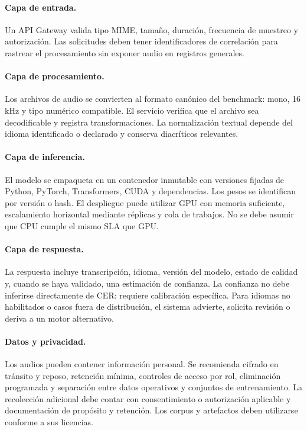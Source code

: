 \documentclass[11pt,letterpaper]{article}
\begin{document}
\paragraph{Capa de entrada.} Un API Gateway valida tipo MIME, tamaño, duración, frecuencia de muestreo y autorización. Las solicitudes deben tener identificadores de correlación para rastrear el procesamiento sin exponer audio en registros generales.

\paragraph{Capa de procesamiento.} Los archivos de audio se convierten al formato canónico del benchmark: mono, 16 kHz y tipo numérico compatible. El servicio verifica que el archivo sea decodificable y registra transformaciones. La normalización textual depende del idioma identificado o declarado y conserva diacríticos relevantes.

\paragraph{Capa de inferencia.} El modelo se empaqueta en un contenedor inmutable con versiones fijadas de Python, PyTorch, Transformers, CUDA y dependencias. Los pesos se identifican por versión o hash. El despliegue puede utilizar GPU con memoria suficiente, escalamiento horizontal mediante réplicas y cola de trabajos. No se debe asumir que CPU cumple el mismo SLA que GPU.

\paragraph{Capa de respuesta.} La respuesta incluye transcripción, idioma, versión del modelo, estado de calidad y, cuando se haya validado, una estimación de confianza. La confianza no debe inferirse directamente de CER: requiere calibración específica. Para idiomas no habilitados o casos fuera de distribución, el sistema advierte, solicita revisión o deriva a un motor alternativo.

\paragraph{Datos y privacidad.} Los audios pueden contener información personal. Se recomienda cifrado en tránsito y reposo, retención mínima, controles de acceso por rol, eliminación programada y separación entre datos operativos y conjuntos de entrenamiento. La recolección adicional debe contar con consentimiento o autorización aplicable y documentación de propósito y retención. Los corpus y artefactos deben utilizarse conforme a sus licencias.
\end{document}
